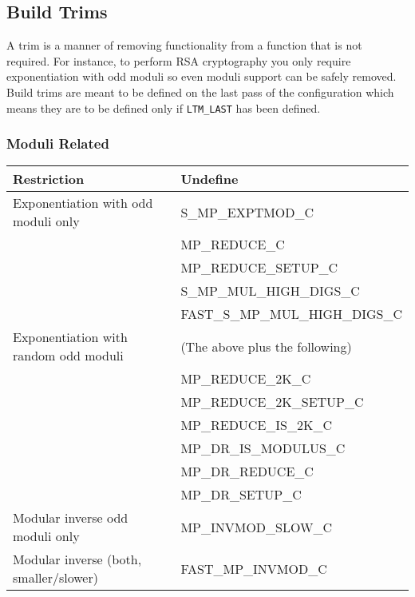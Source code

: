 \documentclass[synpaper]{book}
\begin{document}
\subsection{Build Trims}
A trim is a manner of removing functionality from a function that is not required.  For instance,
to perform RSA cryptography you only require exponentiation with odd moduli so even moduli support
can be safely removed. Build trims are meant to be defined on the last pass of the configuration
which means they are to be defined only if \texttt{LTM\_LAST} has been defined.

\subsubsection{Moduli Related}
\begin{small}
  \begin{center}
    \begin{tabular}{|l|l|}
      \hline \textbf{Restriction}                   & \textbf{Undefine}               \\
      \hline Exponentiation with odd moduli only    & S\_MP\_EXPTMOD\_C               \\
                                                    & MP\_REDUCE\_C                   \\
                                                    & MP\_REDUCE\_SETUP\_C            \\
                                                    & S\_MP\_MUL\_HIGH\_DIGS\_C       \\
                                                    & FAST\_S\_MP\_MUL\_HIGH\_DIGS\_C \\
      \hline Exponentiation with random odd moduli  & (The above plus the following)  \\
                                                    & MP\_REDUCE\_2K\_C               \\
                                                    & MP\_REDUCE\_2K\_SETUP\_C        \\
                                                    & MP\_REDUCE\_IS\_2K\_C           \\
                                                    & MP\_DR\_IS\_MODULUS\_C          \\
                                                    & MP\_DR\_REDUCE\_C               \\
                                                    & MP\_DR\_SETUP\_C                \\
      \hline Modular inverse odd moduli only        & MP\_INVMOD\_SLOW\_C             \\
      \hline Modular inverse (both, smaller/slower) & FAST\_MP\_INVMOD\_C             \\
      \hline
    \end{tabular}
  \end{center}
\end{small}
\end{document}
